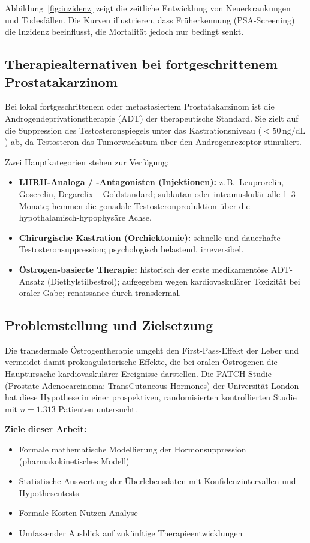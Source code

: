﻿\documentclass[a4paper,12pt]{article}
\theoremstyle{definition}
\begin{document}
Abbildung~\ref{fig:inzidenz} zeigt die zeitliche Entwicklung von Neuerkrankungen und Todesfällen.
Die Kurven illustrieren, dass Früherkennung (PSA-Screening) die Inzidenz beeinflusst, die Mortalität jedoch nur bedingt senkt.

\subsection{Therapiealternativen bei fortgeschrittenem Prostatakarzinom}

Bei lokal fortgeschrittenem oder metastasiertem Prostatakarzinom ist die Androgendeprivationstherapie (ADT) der therapeutische Standard.
Sie zielt auf die Suppression des Testosteronspiegels unter das Kastrationsniveau ($< 50\,\text{ng/dL}$) ab, da Testosteron das Tumorwachstum über den Androgenrezeptor stimuliert.

Zwei Hauptkategorien stehen zur Verfügung:
\begin{itemize}
  \item \textbf{LHRH-Analoga / -Antagonisten (Injektionen):} z.\,B.\ Leuprorelin, Goserelin, Degarelix -- Goldstandard; subkutan oder intramuskulär alle 1--3 Monate; hemmen die gonadale Testosteronproduktion über die hypothalamisch-hypophysäre Achse.
  \item \textbf{Chirurgische Kastration (Orchiektomie):} schnelle und dauerhafte Testosteronsuppression; psychologisch belastend, irreversibel.
  \item \textbf{Östrogen-basierte Therapie:} historisch der erste medikamentöse ADT-Ansatz (Diethylstilbestrol); aufgegeben wegen kardiovaskulärer Toxizität bei oraler Gabe; renaissance durch transdermal.
\end{itemize}

\subsection{Problemstellung und Zielsetzung}

Die transdermale Östrogentherapie umgeht den First-Pass-Effekt der Leber und vermeidet damit prokoagulatorische Effekte, die bei oralen Östrogenen die Hauptursache kardiovaskulärer Ereignisse darstellen.
Die PATCH-Studie (Prostate Adenocarcinoma: TransCutaneous Hormones) der Universität London hat diese Hypothese in einer prospektiven, randomisierten kontrollierten Studie mit $n = 1.313$ Patienten untersucht.

\textbf{Ziele dieser Arbeit:}
\begin{itemize}
  \item Formale mathematische Modellierung der Hormonsuppression (pharmakokinetisches Modell)
  \item Statistische Auswertung der Überlebensdaten mit Konfidenzintervallen und Hypothesentests
  \item Formale Kosten-Nutzen-Analyse
  \item Umfassender Ausblick auf zukünftige Therapieentwicklungen
\end{itemize}
\end{document}

